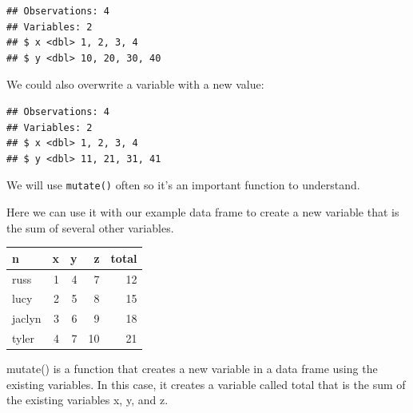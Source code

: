\documentclass[12pt,]{book}
\newenvironment{Shaded}{\begin{snugshade}}{\end{snugshade}}
\newcommand{\CommentTok}[1]{\textcolor[rgb]{0.56,0.35,0.01}{\textit{#1}}}
\newcommand{\DataTypeTok}[1]{\textcolor[rgb]{0.13,0.29,0.53}{#1}}
\newcommand{\DecValTok}[1]{\textcolor[rgb]{0.00,0.00,0.81}{#1}}
\newcommand{\KeywordTok}[1]{\textcolor[rgb]{0.13,0.29,0.53}{\textbf{#1}}}
\newcommand{\NormalTok}[1]{#1}
\newcommand{\OperatorTok}[1]{\textcolor[rgb]{0.81,0.36,0.00}{\textbf{#1}}}
\newcommand{\StringTok}[1]{\textcolor[rgb]{0.31,0.60,0.02}{#1}}
\begin{document}
\begin{verbatim}
## Observations: 4
## Variables: 2
## $ x <dbl> 1, 2, 3, 4
## $ y <dbl> 10, 20, 30, 40
\end{verbatim}

We could also overwrite a variable with a new value:

\begin{Shaded}
\end{Shaded}

\begin{verbatim}
## Observations: 4
## Variables: 2
## $ x <dbl> 1, 2, 3, 4
## $ y <dbl> 11, 21, 31, 41
\end{verbatim}

We will use \texttt{mutate()} often so it's an important function to understand.

Here we can use it with our example data frame to create a new variable that is the sum of several other variables.

\begin{Shaded}
\end{Shaded}

\begin{tabular}{l|r|r|r|r}
\hline
n & x & y & z & total\\
\hline
russ & 1 & 4 & 7 & 12\\
\hline
lucy & 2 & 5 & 8 & 15\\
\hline
jaclyn & 3 & 6 & 9 & 18\\
\hline
tyler & 4 & 7 & 10 & 21\\
\hline
\end{tabular}

mutate() is a function that creates a new variable in a data frame using the existing variables. In this case, it creates a variable called total that is the sum of the existing variables x, y, and z.
\end{document}
